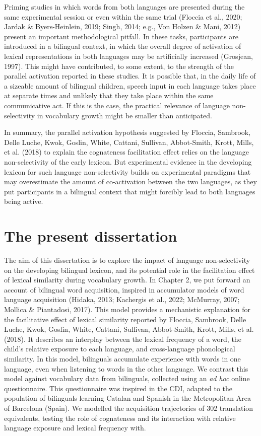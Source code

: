 \documentclass[
  12pt,
  b5paperpaper,
  twoside]{scrreprt}
\begin{document}
Priming studies in which words from both languages are presented during
the same experimental session or even within the same trial (Floccia et
al., 2020; Jardak \& Byers-Heinlein, 2019; Singh, 2014; e.g., Von Holzen
\& Mani, 2012) present an important methodological pitfall. In these
tasks, participants are introduced in a bilingual context, in which the
overall degree of activation of lexical representations in both
languages may be artificially increased (Grosjean, 1997). This might
have contributed, to some extent, to the strength of the parallel
activation reported in these studies. It is possible that, in the daily
life of a sizeable amount of bilingual children, speech input in each
language takes place at separate times and unlikely that they take place
within the same communicative act. If this is the case, the practical
relevance of language non-selectivity in vocabulary growth might be
smaller than anticipated.

In summary, the parallel activation hypothesis suggested by Floccia,
Sambrook, Delle Luche, Kwok, Goslin, White, Cattani, Sullivan,
Abbot-Smith, Krott, Mills, et al. (2018) to explain the cognateness
facilitation effect relies on the language non-selectivity of the early
lexicon. But experimental evidence in the developing lexicon for such
language non-selectivity builds on experimental paradigms that may
overestimate the amount of co-activation between the two languages, as
they put participants in a bilingual context that might forcibly lead to
both languages being active.

\hypertarget{the-present-dissertation}{%
\section{The present dissertation}\label{the-present-dissertation}}

The aim of this dissertation is to explore the impact of language
non-selectivity on the developing bilingual lexicon, and its potential
role in the facilitation effect of lexical similarity during vocabulary
growth. In Chapter 2, we put forward an account of bilingual word
acquisition, inspired in accumulator models of word language acquisition
(Hidaka, 2013; Kachergis et al., 2022; McMurray, 2007; Mollica \&
Piantadosi, 2017). This model provides a mechanistic explanation for the
facilitative effect of lexical similarity reported by Floccia, Sambrook,
Delle Luche, Kwok, Goslin, White, Cattani, Sullivan, Abbot-Smith, Krott,
Mills, et al. (2018). It describes an interplay between the lexical
frequency of a word, the child's relative exposure to each language, and
cross-language phonological similarity. In this model, bilinguals
accumulate experience with words in one language, even when listening to
words in the other language. We contrast this model against vocabulary
data from bilinguals, collected using an \emph{ad hoc} online
questionnaire. This questionnaire was inspired in the CDI, adapted to
the population of bilinguals learning Catalan and Spanish in the
Metropolitan Area of Barcelona (Spain). We modelled the acquisition
trajectories of 302 translation equivalents, testing the role of
cognateness and its interaction with relative language exposure and
lexical frequency with.
\end{document}

